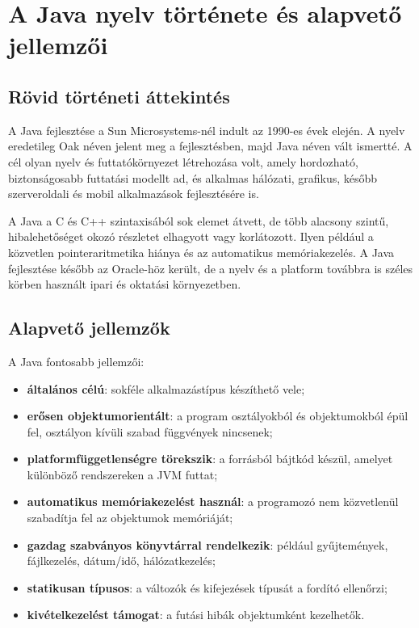 \begin{center}

\end{center}

\section{A Java nyelv története és alapvető jellemzői}

\subsection{Rövid történeti áttekintés}

A Java fejlesztése a Sun Microsystems-nél indult az 1990-es évek elején. A nyelv eredetileg Oak néven jelent meg a fejlesztésben, majd Java néven vált ismertté. A cél olyan nyelv és futtatókörnyezet létrehozása volt, amely hordozható, biztonságosabb futtatási modellt ad, és alkalmas hálózati, grafikus, később szerveroldali és mobil alkalmazások fejlesztésére is.

A Java a C és C++ szintaxisából sok elemet átvett, de több alacsony szintű, hibalehetőséget okozó részletet elhagyott vagy korlátozott. Ilyen például a közvetlen pointeraritmetika hiánya és az automatikus memóriakezelés. A Java fejlesztése később az Oracle-höz került, de a nyelv és a platform továbbra is széles körben használt ipari és oktatási környezetben.

\subsection{Alapvető jellemzők}

A Java fontosabb jellemzői:

\begin{itemize}
  \item \textbf{általános célú}: sokféle alkalmazástípus készíthető vele;
  \item \textbf{erősen objektumorientált}: a program osztályokból és objektumokból épül fel, osztályon kívüli szabad függvények nincsenek;
  \item \textbf{platformfüggetlenségre törekszik}: a forrásból bájtkód készül, amelyet különböző rendszereken a JVM futtat;
  \item \textbf{automatikus memóriakezelést használ}: a programozó nem közvetlenül szabadítja fel az objektumok memóriáját;
  \item \textbf{gazdag szabványos könyvtárral rendelkezik}: például gyűjtemények, fájlkezelés, dátum/idő, hálózatkezelés;
  \item \textbf{statikusan típusos}: a változók és kifejezések típusát a fordító ellenőrzi;
  \item \textbf{kivételkezelést támogat}: a futási hibák objektumként kezelhetők.
\end{itemize}

